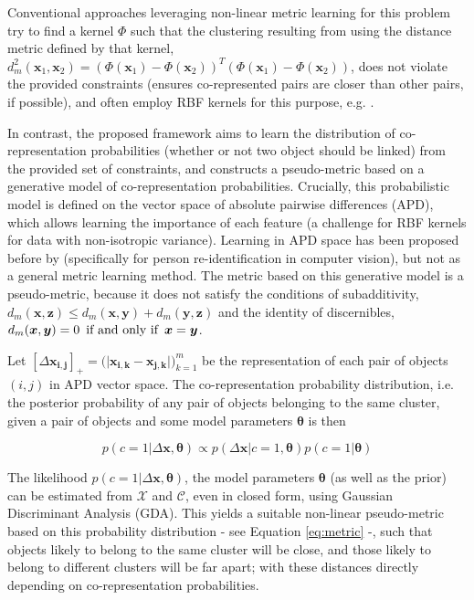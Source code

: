 Conventional approaches leveraging non-linear metric learning for this problem try to find a kernel $\Phi$ such that the clustering resulting from using the distance metric defined by that kernel, $d_m^2(\bm x_1, \bm x_2)=(\Phi(\bm x_1)-\Phi(\bm x_2))^T(\Phi(\bm x_1)-\Phi(\bm x_2))$, does not violate the provided constraints (ensures co-represented pairs are closer than other pairs, if possible), and often employ RBF kernels for this purpose, e.g. \citep{baghshah2010kernel, chitta2011approximate}. 

In contrast, the proposed framework aims to learn the distribution of co-representation probabilities (whether or not two object should be linked) from the provided set of constraints, and constructs a pseudo-metric based on a generative model of co-representation probabilities. Crucially, this probabilistic model is defined on the vector space of absolute pairwise differences (APD), which allows learning the importance of each feature (a challenge for RBF kernels for data with non-isotropic variance). Learning in APD space has been proposed before by \cite{zheng2011person} (specifically for person re-identification in computer vision), but not as a general metric learning method. The metric based on this generative model is a pseudo-metric, because it does not satisfy the conditions of subadditivity, $d_m(\bm x, \bm z) \leq d_m(\bm x, \bm y)+d_m(\bm y,\bm z)$ and the identity of discernibles, $d_m(\bm x, \bm y) = 0 \enskip \text{if and only if} \enskip \bm x = \bm y$.

Let $[\Delta \bm{x_{i,j}}]_+ = \big( \lvert \bm{x_{i,k}} - \bm{x_{j,k}} \lvert \big)_{k=1}^m $ be the representation of each pair of objects $(i,j)$ in APD vector space. The co-representation probability distribution, i.e. the posterior probability of any pair of objects belonging to the same cluster, given a pair of objects and some model parameters $\bm{\theta}$ is then 

\begin{equation}
\label{eq:linkprob}
p(c=1|\Delta \bm{x}, \bm{\theta}) \propto p(\Delta \bm{x} | c=1, \bm{\theta}) p(c=1|\bm{\theta})
\end{equation}

The likelihood $ p(c=1|\Delta \bm{x}, \bm{\theta}) $, the model parameters $ \bm{\theta} $ (as well as the prior) can be estimated from $\mathcal{X}$ and $\mathcal{C}$, even in closed form, using Gaussian Discriminant Analysis (GDA). This yields a suitable non-linear pseudo-metric based on this probability distribution - see Equation \ref{eq:metric} -, such that objects likely to belong to the same cluster will be close, and those likely to belong to different clusters will be far apart; with these distances directly depending on co-representation probabilities. 

